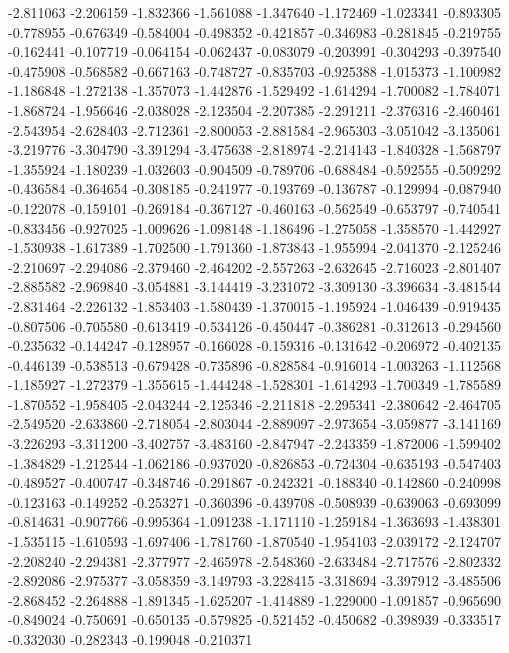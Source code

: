 -2.811063
-2.206159
-1.832366
-1.561088
-1.347640
-1.172469
-1.023341
-0.893305
-0.778955
-0.676349
-0.584004
-0.498352
-0.421857
-0.346983
-0.281845
-0.219755
-0.162441
-0.107719
-0.064154
-0.062437
-0.083079
-0.203991
-0.304293
-0.397540
-0.475908
-0.568582
-0.667163
-0.748727
-0.835703
-0.925388
-1.015373
-1.100982
-1.186848
-1.272138
-1.357073
-1.442876
-1.529492
-1.614294
-1.700082
-1.784071
-1.868724
-1.956646
-2.038028
-2.123504
-2.207385
-2.291211
-2.376316
-2.460461
-2.543954
-2.628403
-2.712361
-2.800053
-2.881584
-2.965303
-3.051042
-3.135061
-3.219776
-3.304790
-3.391294
-3.475638
-2.818974
-2.214143
-1.840328
-1.568797
-1.355924
-1.180239
-1.032603
-0.904509
-0.789706
-0.688484
-0.592555
-0.509292
-0.436584
-0.364654
-0.308185
-0.241977
-0.193769
-0.136787
-0.129994
-0.087940
-0.122078
-0.159101
-0.269184
-0.367127
-0.460163
-0.562549
-0.653797
-0.740541
-0.833456
-0.927025
-1.009626
-1.098148
-1.186496
-1.275058
-1.358570
-1.442927
-1.530938
-1.617389
-1.702500
-1.791360
-1.873843
-1.955994
-2.041370
-2.125246
-2.210697
-2.294086
-2.379460
-2.464202
-2.557263
-2.632645
-2.716023
-2.801407
-2.885582
-2.969840
-3.054881
-3.144419
-3.231072
-3.309130
-3.396634
-3.481544
-2.831464
-2.226132
-1.853403
-1.580439
-1.370015
-1.195924
-1.046439
-0.919435
-0.807506
-0.705580
-0.613419
-0.534126
-0.450447
-0.386281
-0.312613
-0.294560
-0.235632
-0.144247
-0.128957
-0.166028
-0.159316
-0.131642
-0.206972
-0.402135
-0.446139
-0.538513
-0.679428
-0.735896
-0.828584
-0.916014
-1.003263
-1.112568
-1.185927
-1.272379
-1.355615
-1.444248
-1.528301
-1.614293
-1.700349
-1.785589
-1.870552
-1.958405
-2.043244
-2.125346
-2.211818
-2.295341
-2.380642
-2.464705
-2.549520
-2.633860
-2.718054
-2.803044
-2.889097
-2.973654
-3.059877
-3.141169
-3.226293
-3.311200
-3.402757
-3.483160
-2.847947
-2.243359
-1.872006
-1.599402
-1.384829
-1.212544
-1.062186
-0.937020
-0.826853
-0.724304
-0.635193
-0.547403
-0.489527
-0.400747
-0.348746
-0.291867
-0.242321
-0.188340
-0.142860
-0.240998
-0.123163
-0.149252
-0.253271
-0.360396
-0.439708
-0.508939
-0.639063
-0.693099
-0.814631
-0.907766
-0.995364
-1.091238
-1.171110
-1.259184
-1.363693
-1.438301
-1.535115
-1.610593
-1.697406
-1.781760
-1.870540
-1.954103
-2.039172
-2.124707
-2.208240
-2.294381
-2.377977
-2.465978
-2.548360
-2.633484
-2.717576
-2.802332
-2.892086
-2.975377
-3.058359
-3.149793
-3.228415
-3.318694
-3.397912
-3.485506
-2.868452
-2.264888
-1.891345
-1.625207
-1.414889
-1.229000
-1.091857
-0.965690
-0.849024
-0.750691
-0.650135
-0.579825
-0.521452
-0.450682
-0.398939
-0.333517
-0.332030
-0.282343
-0.199048
-0.210371
